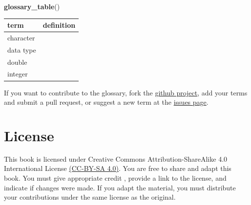 \documentclass[
  oneside]{book}
\newenvironment{Shaded}{\begin{snugshade}}{\end{snugshade}}
\newcommand{\FunctionTok}[1]{\textcolor[rgb]{0.13,0.29,0.53}{\textbf{#1}}}
\newcommand{\NormalTok}[1]{#1}
\begin{document}
\begin{Shaded}
\begin{Highlighting}[]
\FunctionTok{glossary\_table}\NormalTok{()}
\end{Highlighting}
\end{Shaded}

\begin{table}
\centering
\begin{tabular}{l|l}
\hline
term & definition\\
\hline
character & \\
\hline
data type & \\
\hline
double & \\
\hline
integer & \\
\hline
\end{tabular}
\end{table}

If you want to contribute to the glossary, fork the \href{https://github.com/PsyTeachR/glossary}{github project}, add your terms and submit a pull request, or suggest a new term at the \href{https://github.com/PsyTeachR/glossary/issues}{issues page}.

\hypertarget{license}{%
\chapter*{License}\label{license}}

This book is licensed under Creative Commons Attribution-ShareAlike 4.0 International License \href{https://creativecommons.org/licenses/by-sa/4.0/}{(CC-BY-SA 4.0)}. You are free to share and adapt this book. You must give appropriate credit \citep{psyteachr-template}, provide a link to the license, and indicate if changes were made. If you adapt the material, you must distribute your contributions under the same license as the original.

  
\end{document}
